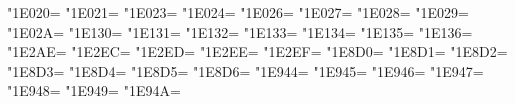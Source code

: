 \XeTeXcharclass"1E020=\KclassCM
\XeTeXcharclass"1E021=\KclassCM
\XeTeXcharclass"1E023=\KclassCM
\XeTeXcharclass"1E024=\KclassCM
\XeTeXcharclass"1E026=\KclassCM
\XeTeXcharclass"1E027=\KclassCM
\XeTeXcharclass"1E028=\KclassCM
\XeTeXcharclass"1E029=\KclassCM
\XeTeXcharclass"1E02A=\KclassCM
\XeTeXcharclass"1E130=\KclassCM
\XeTeXcharclass"1E131=\KclassCM
\XeTeXcharclass"1E132=\KclassCM
\XeTeXcharclass"1E133=\KclassCM
\XeTeXcharclass"1E134=\KclassCM
\XeTeXcharclass"1E135=\KclassCM
\XeTeXcharclass"1E136=\KclassCM
\XeTeXcharclass"1E2AE=\KclassCM
\XeTeXcharclass"1E2EC=\KclassCM
\XeTeXcharclass"1E2ED=\KclassCM
\XeTeXcharclass"1E2EE=\KclassCM
\XeTeXcharclass"1E2EF=\KclassCM
\XeTeXcharclass"1E8D0=\KclassCM
\XeTeXcharclass"1E8D1=\KclassCM
\XeTeXcharclass"1E8D2=\KclassCM
\XeTeXcharclass"1E8D3=\KclassCM
\XeTeXcharclass"1E8D4=\KclassCM
\XeTeXcharclass"1E8D5=\KclassCM
\XeTeXcharclass"1E8D6=\KclassCM
\XeTeXcharclass"1E944=\KclassCM
\XeTeXcharclass"1E945=\KclassCM
\XeTeXcharclass"1E946=\KclassCM
\XeTeXcharclass"1E947=\KclassCM
\XeTeXcharclass"1E948=\KclassCM
\XeTeXcharclass"1E949=\KclassCM
\XeTeXcharclass"1E94A=\KclassCM

